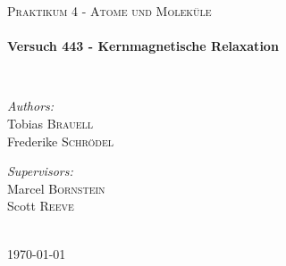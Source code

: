 \begin{titlepage}
\begin{center}
    \textsc{\Large Praktikum 4 - Atome und Moleküle}\\[0.5 cm]

    \HRule \\[0.4 cm]
    { \huge \bfseries Versuch 443 - Kernmagnetische Relaxation \\[0.4 cm] }

    \HRule \\[1.5 cm]

    \noindent
    \begin{minipage}{0.4\textwidth}
      \begin{flushleft} \large
	\emph{Authors:}\\
	Tobias \textsc{Brauell}\\
	Frederike \textsc{Schrödel}
      \end{flushleft}
    \end{minipage}%
    \begin{minipage}{0.4\textwidth}
      \begin{flushright} \large
	\emph{Supervisors:} \\
        Marcel \textsc{Bornstein} \\
        Scott \textsc{Reeve}
      \end{flushright}
    \end{minipage}

    \vfill

    \HRule \\[0.4 cm]
    {\large \today}

  \end{center}
\end{titlepage}